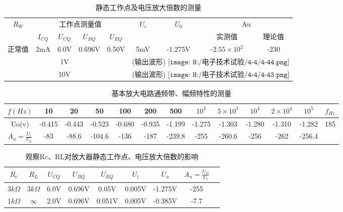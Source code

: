\documentclass{article}
\begin{document}
\begin{table}[h]
	\centering  
	\begin{tabular}{c|c|c|c|c|c|c|c|c}
		\hline
		\multirow{2}{*}{$R_W$} & \multicolumn{4}{c}{工作点测量值} \vline    &  \multirow{2}{*}{$U_i$} & \multirow{2}{*}{$U_0$} & \multicolumn{2}{c}{Au} \\ \cline{2-5} \cline{8-9}	 
		                       & $I_{CQ}$  & $U_{CQ}$ & $U_{BQ}$ & $U_{EQ}$& &                       &实测值                  &理论值\\ \hline
		               正常值   & 2mA     &    6.0V   & 0.696V    &0.50V    &5mV                     &-1.275V                   & -$2.55 \times 10^2$ &  -230 \\   \hline
		                        &  & 1V & & &\multicolumn{4}{c}{(输出波形) $\texttt{[image: H:/电子技术试验/4-4/4-44.png]}$} \\  \hline
								&  &10V  & & &\multicolumn{4}{c}{(输出波形) $\texttt{[image: H:/电子技术试验/4-4/4-43.png]}$}\\
		\hline
	\end{tabular}
	\caption{静态工作点及电压放大倍数的测量}\label{SIGN}
	\end{table}

	\begin{table}[h]
		\centering  
		\begin{tabular}{c|c|c|c|c|c|c|c|c|c|c|c|c}
			\hline
			                    $f(Hz)$   & 10     & 20    & 50    & 100   & 200   & 500   & $10^3$ & $5 \times 10^3$ & $10^4$ & $2 \times 10^4$ & $10^5$ & $f_{Hz}$ \\ \hline 
								 Uo(v)    & -0.415  & -0.443 & -0.523 & -0.680 & -0.935 &-1.199  & -1.275  &-1.303            & -1.280  & -1.310           & -1.282  & 185     \\ \hline
			      $A_u=\frac{U_i}{U_0}$   & -83     & -88.6  & -104.6 & -136   & -187   & -239.8 & -255    & -260.6            & -256    & -262            & -256.4  &   \\   \hline
								
			\hline
		\end{tabular}
		\caption{基本放大电路通频带、幅频特性的测量}\label{SIGN}
		\end{table}
\newpage
		\begin{table}[h]
			\centering  
			\begin{tabular}{c|c|c|c|c|c|c|c|c}
				\hline
					      $R_c$    & $R_L$       & $U_{CQ}$ & $U_{BQ}$ & $U_{EQ}$ & $U_i$  & $U_o$  &  $A_u=\frac{U_O}{U_i}$ \\ \hline 
					 $3k\Omega $    & $3k\Omega$  & 6.0V     & 0.696V   & 0.05V    & 0.005V & -1.275V &  -255  \\ \hline
					 $1k\Omega$    & $\infty$    & 2.0V     & 0.696V   & 0.051V   & 0.005V & -0.385V &  -7.7 \\   \hline
									
				\hline
			\end{tabular}
			\caption{观察Rc、RL对放大器静态工作点、电压放大倍数的影响}\label{SIGN}
			\end{table}
\end{document}
